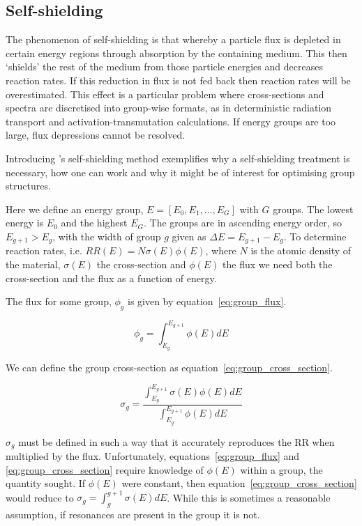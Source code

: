 \subsection{Self-shielding}
\label{subsec:self-shielding}
The phenomenon of self-shielding is that whereby a particle flux is depleted in certain energy regions through absorption by the containing medium. This then `shields' the rest of the medium from those particle energies and decreases reaction rates. If this reduction in flux is not fed back then reaction rates will be overestimated. This effect is a particular problem where cross-sections and spectra are discretised into group-wise formats, as in deterministic radiation transport and activation-transmutation calculations. If energy groups are too large, flux depressions cannot be resolved.

Introducing \citeauthor{Bondarenko1964}'s self-shielding method exemplifies why a self-shielding treatment is necessary, how one can work and why it might be of interest for optimising group structures. 

Here we define an energy group, $E = [E_{0}, E_{1}, \dots, E_{G}]$ with $G$ groups. The lowest energy is $E_{0}$ and the highest $E_{G}$. The groups are in ascending energy order, so $E_{g+1} > E_{g}$, with the width of group $g$ given as $\Delta E = E_{g+1} - E_{g}$. To determine reaction rates, i.e. $RR(E) = N\sigma(E)\phi(E)$, where $N$ is the atomic density of the material, $\sigma(E)$ the cross-section and $\phi(E)$ the flux we need both the cross-section and the flux as a function of energy.

The flux for some group, $\phi_{g}$ is given by equation~\ref{eq:group_flux}.

\begin{equation}
  \label{eq:group_flux}
  \phi_{g} = \int_{E_{g}}^{E_{g+1}} \phi(E) dE
\end{equation}

We can define the group cross-section as equation~\ref{eq:group_cross_section}.

\begin{equation}
  \label{eq:group_cross_section}
  \sigma_{g} = \frac{\int_{E_{g}}^{E_{g+1}} \sigma(E) \phi(E) dE}{\int_{E_{g}}^{E_{g+1}} \phi(E) dE}
\end{equation}

$\sigma_{g}$ must be defined in such a way that it accurately reproduces the RR when multiplied by the flux. Unfortunately, equations~\ref{eq:group_flux} and \ref{eq:group_cross_section} require knowledge of $\phi(E)$ within a group, the quantity sought. If $\phi(E)$ were constant, then equation~\ref{eq:group_cross_section} would reduce to $\sigma_{g} = \int_{g}^{g+1} \sigma(E) dE$. While this is sometimes a reasonable assumption, if resonances are present in the group it is not. 

